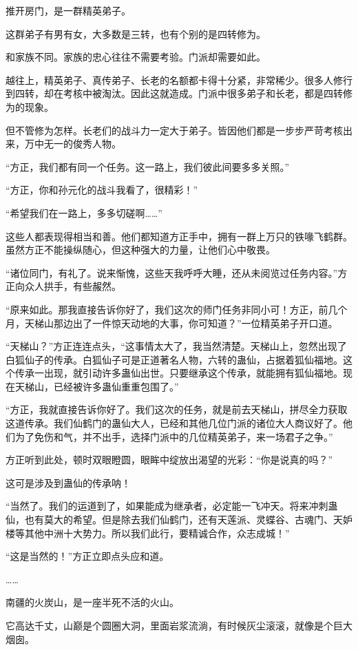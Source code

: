 \begin{this_body}
推开房门，是一群精英弟子。

这群弟子有男有女，大多数是三转，也有个别的是四转修为。

和家族不同。家族的忠心往往不需要考验。门派却需要如此。

越往上，精英弟子、真传弟子、长老的名额都卡得十分紧，非常稀少。很多人修行到四转，却在考核中被淘汰。因此这就造成。门派中很多弟子和长老，都是四转修为的现象。

但不管修为怎样。长老们的战斗力一定大于弟子。皆因他们都是一步步严苛考核出来，万中无一的俊秀人物。

“方正，我们都有同一个任务。这一路上，我们彼此间要多多关照。”

“方正，你和孙元化的战斗我看了，很精彩！”

“希望我们在一路上，多多切磋啊……”

这些人都表现得相当和善。他们都知道方正手中，拥有一群上万只的铁喙飞鹤群。虽然方正不能操纵随心，但这种强大的力量，让他们心中敬畏。

“诸位同门，有礼了。说来惭愧，这些天我呼呼大睡，还从未阅览过任务内容。”方正向众人拱手，有些赧然。

“原来如此。那我直接告诉你好了，我们这次的师门任务非同小可！方正，前几个月，天梯山那边出了一件惊天动地的大事，你可知道？”一位精英弟子开口道。

“天梯山？”方正连连点头，“这事情太大了，我当然清楚。天梯山上，忽然出现了白狐仙子的传承。白狐仙子可是正道著名人物，六转的蛊仙，占据着狐仙福地。这个传承一出现，就引动许多蛊仙出世。只要继承这个传承，就能拥有狐仙福地。现在天梯山，已经被许多蛊仙重重包围了。”

“方正，我就直接告诉你好了。我们这次的任务，就是前去天梯山，拼尽全力获取这道传承。我们仙鹤门的蛊仙大人，已经和其他几位门派的诸位大人商议好了。他们为了免伤和气，并不出手，选择门派中的几位精英弟子，来一场君子之争。”

方正听到此处，顿时双眼瞪圆，眼眸中绽放出渴望的光彩：“你是说真的吗？”

这可是涉及到蛊仙的传承呐！

“当然了。我们的运道到了，如果能成为继承者，必定能一飞冲天。将来冲刺蛊仙，也有莫大的希望。但是除去我们仙鹤门，还有天莲派、灵蝶谷、古魂门、天妒楼等其他中洲十大势力。所以我们此行，要精诚合作，众志成城！”

“这是当然的！”方正立即点头应和道。

……

南疆的火炭山，是一座半死不活的火山。

它高达千丈，山巅是个圆圈大洞，里面岩浆流淌，有时候灰尘滚滚，就像是个巨大烟囱。


\end{this_body}
